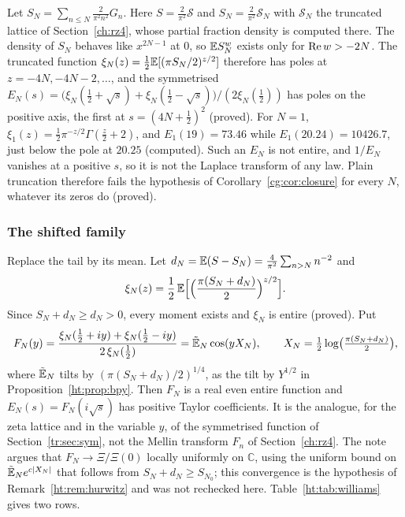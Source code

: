 Let $S_N=\sum_{n\le N}\frac{2}{\pi^2n^2}G_n$. Here $S=\frac2{\pi^2}\mathcal S$ and $S_N=\frac2{\pi^2}\mathcal S_N$ with $\mathcal S_N$ the truncated lattice of Section~\ref{ch:rz4}, whose partial fraction density is computed there. The density of $S_N$ behaves like $x^{2N-1}$ at $0$, so $\mathbb{E} S_N^{w}$ exists only for $\operatorname{Re} w>-2N$. The truncated function $\xi_N(z)=\frac12\mathbb{E}[(\pi S_N/2)^{z/2}]$ therefore has poles at $z=-4N,-4N-2,\ldots$, and the symmetrised $E_N(s)=\bigl(\xi_N(\frac12+\sqrt s)+\xi_N(\frac12-\sqrt s)\bigr)/(2\xi_N(\frac12))$ has poles on the positive axis, the first at $s=(4N+\frac12)^2$ (proved). For $N=1$, $\xi_1(z)=\frac12\pi^{-z/2}\Gamma(\frac z2+2)$, and $E_1(19)=73.46$ while $E_1(20.24)=10426.7$, just below the pole at $20.25$ (computed). Such an $E_N$ is not entire, and $1/E_N$ vanishes at a positive $s$, so it is not the Laplace transform of any law. Plain truncation therefore fails the hypothesis of Corollary~\ref{cg:cor:closure} for every $N$, whatever its zeros do (proved).

\subsubsection{The shifted family}

Replace the tail by its mean. Let $d_N=\mathbb{E}(S-S_N)=\frac{4}{\pi^2}\sum_{n>N}n^{-2}$ and
\[
\xi_N(z)=\frac12\,\mathbb{E}\Bigl[\Bigl(\frac{\pi(S_N+d_N)}{2}\Bigr)^{z/2}\Bigr].
\]
Since $S_N+d_N\ge d_N>0$, every moment exists and $\xi_N$ is entire (proved). Put
\[
F_N(y)=\frac{\xi_N(\frac12+iy)+\xi_N(\frac12-iy)}{2\,\xi_N(\frac12)}=\tilde{\mathbb{E}}_N\cos(yX_N),\qquad X_N=\tfrac12\log\bigl(\tfrac{\pi(S_N+d_N)}2\bigr),
\]
where $\tilde{\mathbb{E}}_N$ tilts by $(\pi(S_N+d_N)/2)^{1/4}$, as the tilt by $Y^{1/2}$ in Proposition~\ref{ht:prop:bpy}. Then $F_N$ is a real even entire function and $E_N(s)=F_N(i\sqrt s)$ has positive Taylor coefficients. It is the analogue, for the zeta lattice and in the variable $y$, of the symmetrised function of Section~\ref{tr:sec:sym}, not the Mellin transform $F_n$ of Section~\ref{ch:rz4}. The note argues that $F_N\to\Xi/\Xi(0)$ locally uniformly on $\mathbb C$, using the uniform bound on $\tilde{\mathbb{E}}_Ne^{c|X_N|}$ that follows from $S_N+d_N\ge S_{N_0}$; this convergence is the hypothesis of Remark~\ref{ht:rem:hurwitz} and was not rechecked here. Table~\ref{ht:tab:williams} gives two rows.

